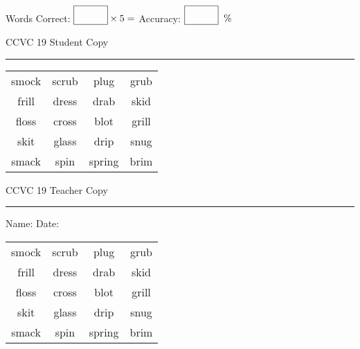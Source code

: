 \documentclass{memoir}
\begin{document}
\normalsize

Words Correct: $\fbox{\phantom{\huge 100}} \times 5 = $ Accuracy: $\fbox{\phantom{\huge 100}}\;\; \%$ 

\vfill

\newpage


\footnotesize \noindent
CCVC 19 \hfill Student Copy
\smallskip
\hrule

\Large

\setlength{\tabcolsep}{14pt}
\def\arraystretch{3}

{\selectfont


\begin{vplace}[0.5]
\begin{center}
\begin{tabular}{cccc}
smock & scrub & plug & grub \\
frill & dress & drab             & skid \\
floss & cross & blot & grill            \\
skit & glass & drip & snug \\
smack & spin & spring & brim      \\
\end{tabular}
\end{center}
\end{vplace}

}

\newpage

\footnotesize \noindent
CCVC 19 \hfill Teacher Copy
\smallskip
\hrule

\normalsize

\vfill

\noindent
Name: \underline{\hspace{1.75in}} \hfill Date: \underline{\hspace{1in}}

\Large

{\selectfont


\begin{vplace}[0.5]
\begin{center}
\begin{tabular}{cccc}
smock & scrub & plug & grub \\
frill & dress & drab             & skid \\
floss & cross & blot & grill            \\
skit & glass & drip & snug \\
smack & spin & spring & brim      \\
\end{tabular}
\end{center}
\end{vplace}



}
\end{document}
